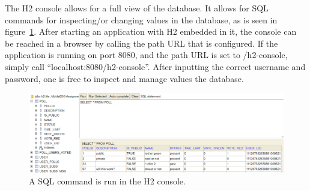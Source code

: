 The H2 console allows for a full view of the database. It allows for SQL commands for inspecting/or changing values in the database, as is seen in figure~\ref{fig:h2console}. After starting an application with H2 embedded in it, the console can be reached in a browser by calling the path URL that is configured. If the application is running on port 8080, and the path URL is set to /h2-console, simply call “localhost:8080/h2-console”. After inputting the correct username and password, one is free to inspect and manage values the database. 
\begin{figure}[H]
  \centering
  \includegraphics[scale=0.45]{figs/h2cons.png}
  \caption[scale=0.5]{A SQL command is run in the H2 console.}
  \label{fig:h2console}
\end{figure}